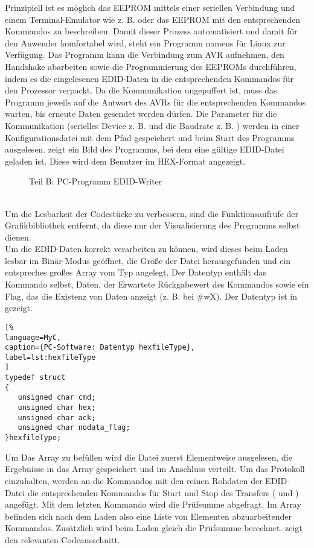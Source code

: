 Prinzipiell ist es möglich das EEPROM mittels einer seriellen Verbindung und einem Terminal-Emulator wie z. B.  oder  das EEPROM mit den entsprechenden Kommandos zu beschreiben. Damit dieser Prozess automatisiert und damit für den Anwender komfortabel wird, steht ein Programm namens  für Linux zur Verfügung. Das Programm kann die Verbindung zum AVR aufnehmen, den Handshake abarbeiten sowie die Programmierung des EEPROMs durchführen, indem es die eingelesenen EDID-Daten in die entsprechenden Kommandos für den Prozessor verpackt. Da die Kommunikation ungepuffert ist, muss das Programm jeweils auf die Antwort des AVRs für die entsprechenden Kommandos warten, bis erneute Daten gesendet werden dürfen. Die Parameter für die Kommunikation (serielles Device z. B.  und die Baudrate z. B. ) werden in einer Konfigurationsdatei mit dem Pfad  gespeichert und beim Start des Programms ausgelesen.  zeigt ein Bild des Programms, bei dem eine gültige EDID-Datei geladen ist. Diese wird dem Benutzer im HEX-Format angezeigt. 
\begin{figure}[htp]
	\center
    \caption{Teil B: PC-Programm EDID-Writer}
    \label{fig:edid_writer1} 
\end{figure}\\
Um die Lesbarkeit der Codestücke zu verbessern, sind die Funktionsaufrufe der Grafikbibliothek  entfernt, da diese nur der Visualisierung des Programms selbst dienen.\\
Um die EDID-Daten korrekt verarbeiten zu können, wird dieses beim Laden lesbar im Binär-Modus geöffnet, die Größe der Datei herausgefunden und ein entspreches großes Array  vom Typ  angelegt. Der Datentyp enthält das Kommando selbst, Daten, der Erwartete Rückgabewert des Kommandos sowie ein Flag, das die Existenz von Daten anzeigt (z. B. bei \#wX\*). Der Datentyp  ist in  gezeigt.
\begin{lstlisting}[%
language=MyC,
caption={PC-Software: Datentyp hexfileType},
label=lst:hexfileType
]
typedef struct
{
   unsigned char cmd;
   unsigned char hex;
   unsigned char ack;
   unsigned char nodata_flag;
}hexfileType;
\end{lstlisting}%
Um Das Array  zu befüllen wird die Datei zuerst Elementweise ausgelesen, die Ergebnisse in das Array  gespeichert und im Anschluss verteilt. Um das Protokoll einzuhalten, werden an die Kommandos mit den reinen Rohdaten der EDID-Datei die entsprechenden Kommandos für Start und Stop des Transfers ( und ) angefügt. Mit dem letzten Kommando wird die Prüfsumme abgefragt. Im Array  befinden sich nach dem Laden also eine Liste von Elementen abzuarbeitender Kommandos. Zusätzlich wird beim Laden gleich die Prüfsumme berechnet.  zeigt den relevanten Codeausschnitt. 
